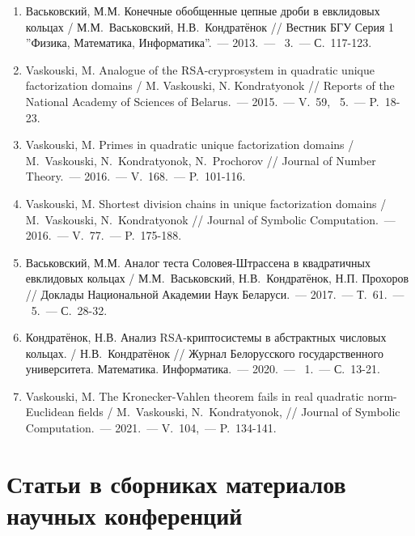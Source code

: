 \documentclass[_00_dissertation.tex]{subfiles}
\begin{document}
\begin{enumerate}

    \item \label{source:Vestnik_BSU_2013}
    Васьковский, М.М. Конечные обобщенные цепные дроби в евклидовых кольцах / М.М.~Васьковский, Н.В.~Кондратёнок // Вестник БГУ Серия 1 ''Физика, Математика, Информатика''.~--- 2013.~--- \textnumero~3.~--- С.~117-123.

    \item \label{source:NANB_2015}
    Vaskouski, M. Analogue of the RSA-cryprosystem in quadratic unique factorization domains / M. Vaskouski, N. Kondratyonok // Reports of the National Academy of Sciences of Belarus.~--- 2015.~--- V.~59, \textnumero~5.~--- P.~18-23.

    \item \label{source:JNT_2016}
    Vaskouski, M. Primes in quadratic unique factorization domains / M.~Vaskouski, N.~Kondratyonok, N.~Prochorov // Journal of Number Theory.~--- 2016.~--- V.~168.~--- P.~101-116.

    \item \label{source:JSC_2016}
    Vaskouski, M. Shortest division chains in unique factorization domains / M.~Vaskouski, N.~Kondratyonok // Journal of Symbolic Computation.~--- 2016.~--- V.~77.~--- P.~175-188.

    \item \label{source:NANB_2017}
    Васьковский, М.М. Аналог теста Соловея-Штрассена в квадратичных евклидовых кольцах / М.М.~Васьковский, Н.В.~Кондратёнок, Н.П. Прохоров // Доклады Национальной Академии Наук Беларуси.~--- 2017.~--- Т.~61.~--- \textnumero~5.~--- С.~28-32.

    \item \label{source:BSU_Journal_2020}
    Кондратёнок, Н.В. Анализ RSA-криптосистемы в абстрактных числовых кольцах. / Н.В.~Кондратёнок // Журнал Белорусского государственного университета. Математика. Информатика.~--- 2020.~--- \textnumero~1.~--- С.~13-21.

    \item \label{source:JSC_2021}
    Vaskouski, M. The Kronecker-Vahlen theorem fails in real quadratic norm-Euclidean fields / M.~Vaskouski, N.~Kondratyonok, // Journal of Symbolic Computation.~--- 2021.~--- V.~104,~--- P.~134-141.
\end{enumerate}

\vspace{-4ex}
\section*{\fontsize{14}{15}\selectfont Статьи в сборниках материалов научных конференций}
\vspace{-4ex}
\end{document}
